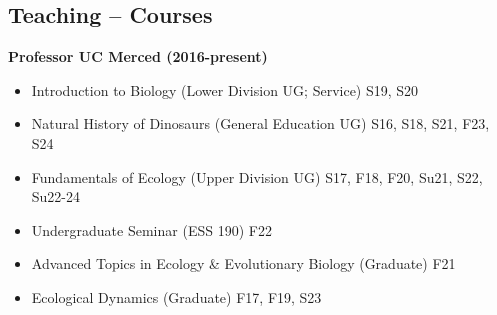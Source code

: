\documentclass[margin,line,12pt]{res}
\begin{document}
\begin{resume}
\section{\sc Teaching -- Courses}
{\bf Professor \@ UC Merced (2016-present)} %
\begin{itemize}
	\item Introduction to Biology (Lower Division UG; Service) \hfill S19, S20
	\item Natural History of Dinosaurs (General Education UG) \hfill S16, S18, S21, F23, S24
	\item Fundamentals of Ecology (Upper Division UG) \hfill S17, F18, F20, Su21, S22, Su22-24
	\item Undergraduate Seminar (ESS 190) \hfill F22
	\item Advanced Topics in Ecology \& Evolutionary Biology (Graduate) \hfill F21
	\item Ecological Dynamics (Graduate) \hfill F17, F19, S23
\end{itemize}




\end{resume}
\end{document}

